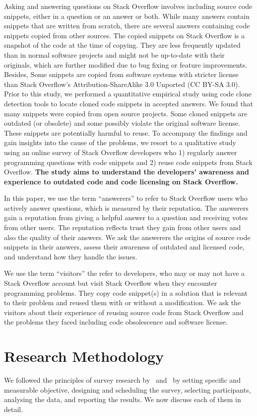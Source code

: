 \documentclass{svjour3}                     %
\begin{document}
Asking and answering questions on Stack Overflow involves including source code
snippets, either in a question or an answer or both. While many answers contain
snippets that are written from scratch, there are several answers containing
code snippets copied from other sources. The copied snippets on Stack Overflow
is a snapshot of the code at the time of copying. They are less frequently
updated than in normal software projects and might not be up-to-date with their
originals, which are further modified due to bug fixing or feature improvements.
Besides, Some snippets are copied from software systems with stricter license
than Stack Overflow's Attribution-ShareAlike 3.0 Unported (CC BY-SA 3.0). Prior
to this study, we performed a quantitative empirical study using code clone
detection tools to locate cloned code snippets in accepted answers. We found
that many snippets were copied from open source projects. Some cloned snippets
are outdated (or obsolete) and some possibly violate the original software
license. These snippets are potentially harmful to reuse. To accompany the
findings and gain insights into the cause of the problems, we resort to a
qualitative study using an online survey of Stack Overflow developers who 1)
regularly answer programming questions with code snippets and 2) reuse code
snippets from Stack Overflow. \textbf{The study aims to understand the
	developers' awareness and experience to outdated code and code licensing on
	Stack Overflow.}

In this paper, we use the term ``answerers'' to refer to Stack Overflow users
who actively answer questions, which is measured by their reputation. The
answerers gain a reputation from giving a helpful answer to a question and
receiving votes from other users. The reputation reflects trust they gain from
other users and also the quality of their answers. We ask the answerers the
origins of source code snippets in their answers, assess their awareness of
outdated and licensed code, and understand how they handle the issues.

We use the term ``visitors'' the refer to developers, who may or may not have a
Stack Overflow account but visit Stack Overflow when they encounter programming
problems. They copy code snippet(s) in a solution that is relevant to their
problem and reused them with or without a modification. We ask the visitors
about their experience of reusing source code from Stack Overflow and the
problems they faced including code obsolescence and software license.

\section{Research Methodology}
We followed the principles of survey research by~\cite{Pfleeger2001}
and~\cite{Kitchenham2002} by setting specific and measurable objective,
designing and scheduling the survey, selecting participants, analysing the data,
and reporting the results. We now discuss each of them in detail.
\end{document}

